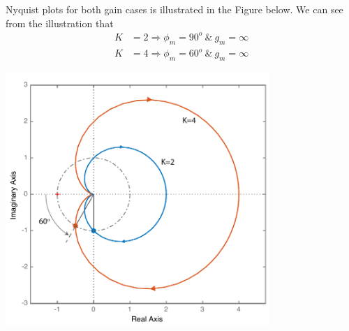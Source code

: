 \documentclass[twoside]{article}
\begin{document}
Nyquist plots for both gain cases is illustrated in the Figure below.
We can see from the illustration that 
%
\begin{align*}
  K &= 2 \Rightarrow \phi_m = 90^o \ \& \ g_m = \infty
  \\
  K &= 4 \Rightarrow \phi_m = 60^o \ \& \ g_m = \infty
\end{align*}

\begin{center}
\begin{minipage}[h]{\linewidth}
    \begin{center}
      \includegraphics[width=0.75\textwidth]{ex2}
    \end{center}
\end{minipage}
\end{center}
\end{document}
